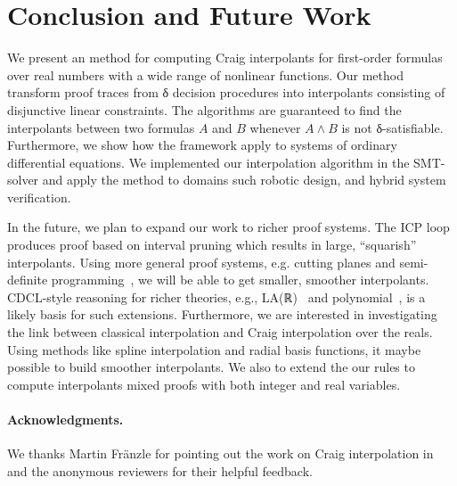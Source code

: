 \section{Conclusion and Future Work}
\label{sec:concl}

We present an method for computing Craig interpolants for first-order formulas over real numbers with a wide range of nonlinear functions.
Our method transform proof traces from δ decision procedures into interpolants consisting of disjunctive linear constraints.
The algorithms are guaranteed to find the interpolants between two formulas $A$ and $B$ whenever $A ∧ B$ is not δ-satisfiable.
Furthermore, we show how the framework apply to systems of ordinary differential equations.
We implemented our interpolation algorithm in the \dReal SMT-solver and apply the method to domains such robotic design, and hybrid system verification.  

In the future, we plan to expand our work to richer proof systems.
The ICP loop produces proof based on interval pruning which results in large, ``squarish'' interpolants.
Using more general proof systems, e.g. cutting planes and semi-definite programming~\cite{DBLP:conf/cav/DaiXZ13}, we will be able to get smaller, smoother interpolants.
CDCL-style reasoning for richer theories, e.g., LA(ℝ)~\cite{DBLP:conf/cav/McMillanKS09} and polynomial~\cite{DBLP:conf/cade/JovanovicM12}, is a likely basis for such extensions.
Furthermore, we are interested in investigating the link between classical interpolation and Craig interpolation over the reals.
Using methods like spline interpolation and radial basis functions, it maybe possible to build smoother interpolants.
We also to extend the our rules to compute interpolants mixed proofs with both integer and real variables.

\paragraph{Acknowledgments.}
We thanks Martin Fr\"anzle for pointing out the work on Craig interpolation in \iSat and the anonymous reviewers for their helpful feedback.

